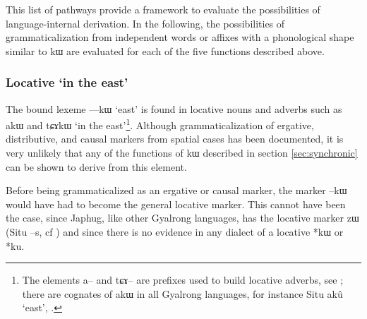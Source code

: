 \documentclass[oldfontcommands,oneside,a4paper,11pt]{article}
\newcommand{\ipa}[1]{{\phon #1}} %
\begin{document}
\begin{table}[H]
\caption{Attested historical origins of functions expressed with \ipa{kɯ}} \centering \label{tab:origins}
\end{table}

This list of pathways provide a framework to evaluate the possibilities of language-internal derivation. In the following, the possibilities of grammaticalization from independent words or affixes with a phonological shape similar to \ipa{kɯ} are evaluated for each of the five functions described above.
 
\subsubsection{Locative `in the east'}
The bound lexeme \ipa{---kɯ}  `east' is found in locative nouns and adverbs such as \ipa{akɯ} and  \ipa{tɕɤkɯ} `in the east'\footnote{The elements \ipa{a--} and \ipa{tɕɤ--} are prefixes used to build locative adverbs, see \citealt[162]{linxr93jiarong}; there are cognates of  \ipa{akɯ} in all Gyalrong languages, for instance Situ \ipa{akû} `east', \citealt[29]{lin02dimension}.}. Although grammaticalization of ergative, distributive, and causal  markers  from spatial cases has been documented, it is very unlikely that any of the functions of \ipa{kɯ} described in section  \ref{sec:synchronic} can be shown to derive from this element. 

Before being grammaticalized as an ergative or causal marker, the marker \ipa{--kɯ} would have had to become the general locative marker. This cannot have been the case, since Japhug, like other Gyalrong languages, has the locative marker \ipa{zɯ} (Situ \ipa{--s}, cf \citealt[330-336]{linxr93jiarong}) and since there is no evidence in any dialect of a locative *\ipa{kɯ} or *\ipa{ku}.
\end{document}
